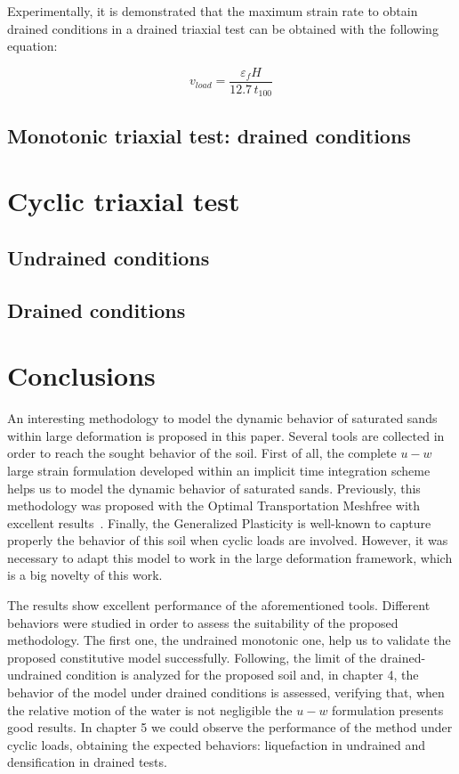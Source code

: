 \documentclass[preprint,12pt,a4paper]{elsarticle}
\begin{document}
Experimentally, it is demonstrated that the maximum strain rate to obtain drained conditions in a drained triaxial test can be obtained with the following equation:

\begin{equation}
v_{load}=\frac{\varepsilon_f H}{12.7 \, t_{100}}
\end{equation}

\subsection{Monotonic triaxial test: drained conditions}
\label{sec:33}

\section{Cyclic triaxial test}
\label{sec:4}

\subsection{Undrained conditions}
\label{subsec:41}

\subsection{Drained conditions}
\label{subsec:42}

\section{Conclusions}
\label{sec:5}

An interesting methodology to model the dynamic behavior of saturated sands within large deformation is proposed in this paper. Several tools are collected in order to reach the sought behavior of the soil. First of all, the complete $u-w$ large strain formulation developed within an implicit time integration scheme helps us to model the dynamic behavior of saturated sands. Previously, this methodology was proposed with the Optimal Transportation Meshfree with excellent results~\cite{Navas:17c}. Finally, the Generalized Plasticity is well-known to capture properly the behavior of this soil when cyclic loads are involved. However, it was necessary to adapt this model to work in the large deformation framework, which is a big novelty of this work.


The results show excellent performance of the aforementioned tools. Different behaviors were studied in order to assess the suitability of the proposed methodology. The first one, the undrained monotonic one, help us to validate the proposed constitutive model successfully. Following, the limit of the drained-undrained condition is analyzed for the proposed soil and, in chapter 4, the behavior of the model under drained conditions is assessed, verifying that, when the relative motion of the water is not negligible the $u-w$ formulation presents good results. In chapter 5 we could observe the performance of the method under cyclic loads, obtaining the expected behaviors: liquefaction in undrained and densification in drained tests.
\end{document}
